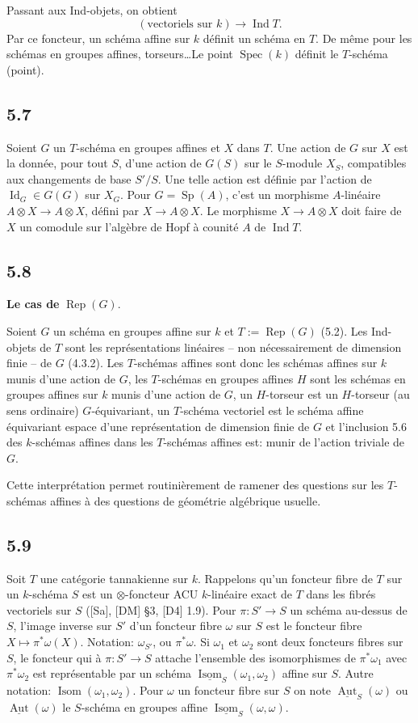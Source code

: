 \documentclass[12pt,a4paper]{article}
\theoremstyle{plain}
\theoremstyle{definition}
\theoremstyle{remark}
\DeclareMathOperator{\Aut}{Aut}
\DeclareMathOperator{\Spec}{Spec}
\DeclareMathOperator{\Ind}{Ind}
\DeclareMathOperator{\Rep}{Rep}
\DeclareMathOperator{\Isom}{Isom}
\DeclareMathOperator{\Sp}{Sp}
\DeclareMathOperator{\Id}{Id}
\begin{document}
Passant aux Ind-objets, on obtient
\[
(\text{vectoriels sur } k) 
\longrightarrow 
\Ind T.
\]
Par ce foncteur, un schéma affine sur $k$ définit un schéma en $T$. De même pour les schémas en groupes affines, torseurs\ldots Le point $\Spec(k)$ définit le $T$-schéma (point).

\subsection*{5.7}
Soient $G$ un $T$-schéma en groupes affines et $X$ dans $T$. Une action de $G$ sur $X$ est la donnée, pour tout $S$, d'une action de $G(S)$ sur le $S$-module $X_S$, compatibles aux changements de base $S'/S$. Une telle action est définie par l'action de $\Id_G 
\in G(G)$ sur $X_G$. Pour $G = 
\Sp(A)$, c'est un morphisme $A$-linéaire $A 
\otimes X 
\to A 
\otimes X$, défini par $X 
\to A 
\otimes X$. Le morphisme $X 
\to A 
\otimes X$ doit faire de $X$ un comodule sur l'algèbre de Hopf à counité $A$ de $\Ind T$.

\subsection*{5.8}
\textbf{Le cas de} $\Rep(G)$.

Soient $G$ un schéma en groupes affine sur $k$ et $T := 
\Rep(G)$ (5.2). Les Ind-objets de $T$ sont les représentations linéaires -- non nécessairement de dimension finie -- de $G$ (4.3.2). Les $T$-schémas affines sont donc les schémas affines sur $k$ munis d'une action de $G$, les $T$-schémas en groupes affines $H$ sont les schémas en groupes affines sur $k$ munis d'une action de $G$, un $H$-torseur est un $H$-torseur (au sens ordinaire) $G$-équivariant, un $T$-schéma vectoriel est le schéma affine équivariant espace d'une représentation de dimension finie de $G$ et l'inclusion 5.6 des $k$-schémas affines dans les $T$-schémas affines est: munir de l'action triviale de $G$.

Cette interprétation permet routinièrement de ramener des questions sur les $T$-schémas affines à des questions de géométrie algébrique usuelle.

\subsection*{5.9}
Soit $T$ une catégorie tannakienne sur $k$. Rappelons qu'un foncteur fibre de $T$ sur un $k$-schéma $S$ est un $\otimes$-foncteur ACU $k$-linéaire exact de $T$ dans les fibrés vectoriels sur $S$ ([Sa], [DM] §3, [D4] 1.9). Pour $\pi: S' 
\to S$ un schéma au-dessus de $S$, l'image inverse sur $S'$ d'un foncteur fibre $\omega$ sur $S$ est le foncteur fibre $X 
\mapsto 
\pi^*\omega(X)$. Notation: $\omega_{S'}$, ou $\pi^*\omega$. Si $\omega_1$ et $\omega_2$ sont deux foncteurs fibres sur $S$, le foncteur qui à $\pi: S' 
\to S$ attache l'ensemble des isomorphismes de $\pi^*\omega_1$ avec $\pi^*\omega_2$ est représentable par un schéma $\underline{\Isom}_S(\omega_1,\omega_2)$ affine sur $S$. Autre notation: $\Isom(\omega_1,\omega_2)$. Pour $\omega$ un foncteur fibre sur $S$ on note $\underline{\Aut}_S(\omega)$ ou $\underline{\Aut}(\omega)$ le $S$-schéma en groupes affine $\underline{\Isom}_S(\omega,\omega)$.
\end{document}
